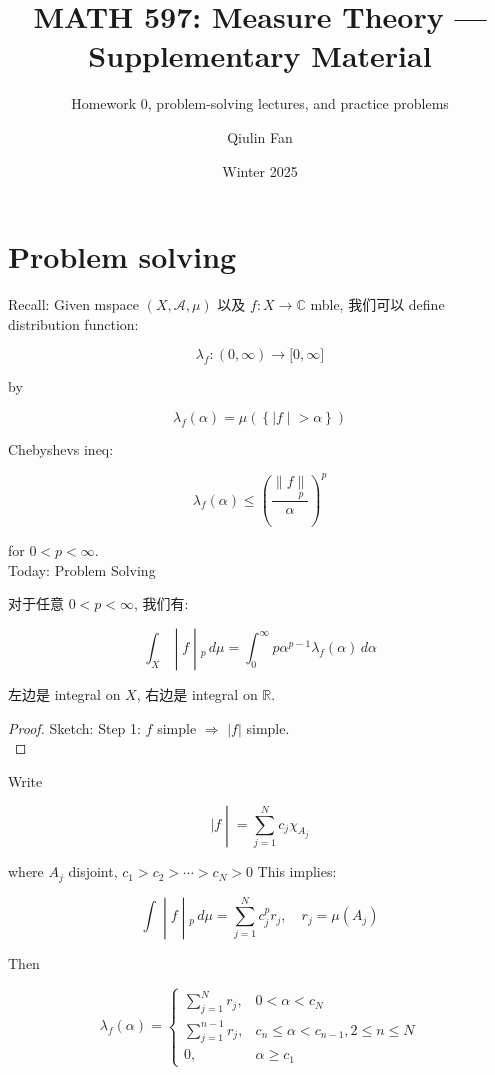 \documentclass{qlnotes-export}
\title{MATH 597: Measure Theory --- Supplementary Material}
\subtitle{Homework 0, problem-solving lectures, and practice problems}
\author{Qiulin Fan}
\date{Winter 2025}
\begin{document}
\mainmatter
\chapter{Problem solving}\label{problem-solving}

Recall: Given mspace \((X,\mathcal{A},\mu)\) 以及 \(f:X\rightarrow{\mathbb{C}}\) mble, 我们可以 define distribution function:

\[\lambda_{f}:(0,\infty)\rightarrow\lbrack 0,\infty\rbrack\]

by

\[\lambda_{f}(\alpha) = \mu(\left\{ |f \middle| > \alpha \right\})\]

Chebyshevs ineq:

\[\lambda_{f}(\alpha) \leq (\frac{\parallel f\underset{p}{\parallel}}{\alpha})^{p}\]

for \(0 < p < \infty\).\\
Today: Problem Solving

\begin{proposition}

对于任意 \(0 < p < \infty\), 我们有:

\[\left. \int_{X} \middle| f \middle| {}_{p}\, d\mu = \int_{0}^{\infty}p\alpha^{p - 1}\lambda_{f}(\alpha)\, d\alpha \right.\]

\end{proposition}

左边是 integral on \(X\), 右边是 integral on \(\mathbb{R}\).

\begin{proof}

Sketch: Step 1: \(f\) simple \(\Longrightarrow\) \(|f|\) simple.\\

\end{proof}

Write

\[\left. |f \middle| = \sum\limits_{j = 1}^{N}c_{j}\chi_{A_{j}} \right.\]

where \(A_{j}\) disjoint, \(c_{1} > c_{2} > \cdots > c_{N} > 0\) This implies:

\[\left. \int \middle| f \middle| {}_{p}\, d\mu = \sum\limits_{j = 1}^{N}c_{j}^{p}r_{j},\quad r_{j} = \mu(A_{j}) \right.\]

Then

\[\lambda_{f}(\alpha) = \left\{ \begin{matrix}
{\sum_{j = 1}^{N}r_{j},} & {0 < \alpha < c_{N}} \\
{\sum_{j = 1}^{n - 1}r_{j},} & {c_{n} \leq \alpha < c_{n - 1},2 \leq n \leq N} \\
{0,} & {\alpha \geq c_{1}}
\end{matrix} \right.\]
\end{document}
